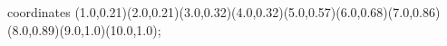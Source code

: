 					coordinates { (1.0,0.21)(2.0,0.21)(3.0,0.32)(4.0,0.32)(5.0,0.57)(6.0,0.68)(7.0,0.86)(8.0,0.89)(9.0,1.0)(10.0,1.0)};